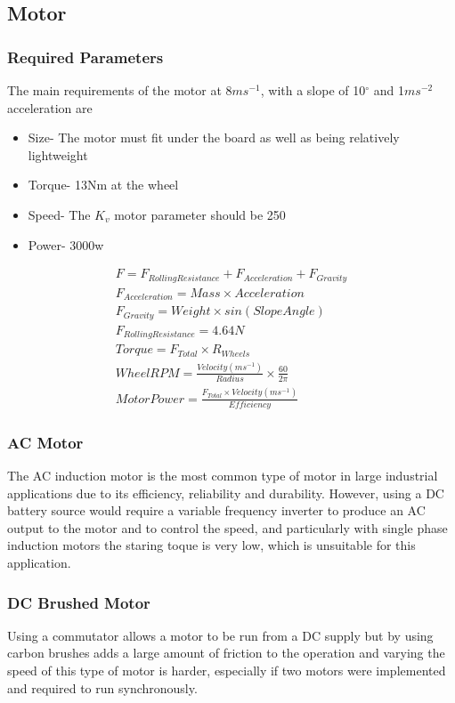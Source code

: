 \documentclass[journal,10pt]{IEEEtran}
\begin{document}
    \subsection{Motor}
        \subsubsection{Required Parameters}
        The main requirements of the motor at 8$ms^{-1}$, with a slope of 10$^{\circ}$ and 1$ms^{-2}$ acceleration are
        \begin{itemize}
        	\item Size- The motor must fit under the board as well as being relatively lightweight
        	\item Torque- 13Nm at the wheel 
        	\item Speed- The $K_{v}$ motor parameter should be 250
        	\item Power- 3000w 
        \end{itemize}
        \begin{gather*}
            F = F_{Rolling Resistance} + F_{Acceleration} + F_{Gravity}
            \\F_{Acceleration} = Mass \times Acceleration
            \\F_{Gravity} = Weight \times sin(Slope  Angle)
            \\F_{Rolling Resistance} = 4.64N
            \\Torque = F_{Total} \times R_{Wheels}
            \\Wheel RPM = \frac{Velocity (ms^{-1})}{Radius}\times \frac{60}{2\pi}
            \\Motor Power = \frac{F_{Total} \times Velocity (ms^{-1})}{Efficiency}
        \end{gather*}

        \subsubsection{AC Motor}
            The AC induction motor is the most common type of motor in large industrial applications due to its efficiency, reliability and durability. However, using a DC battery source would require a variable frequency inverter to produce an AC output to the motor and to control the speed, and particularly with single phase induction motors the staring toque is very low, which is unsuitable for this application. 
        \subsubsection{DC Brushed Motor}
            Using a commutator allows a motor to be run from a DC supply but by using carbon brushes adds a large amount of friction to the operation and varying the speed of this type of motor is harder, especially if two motors were implemented and required to run synchronously.
\end{document}
